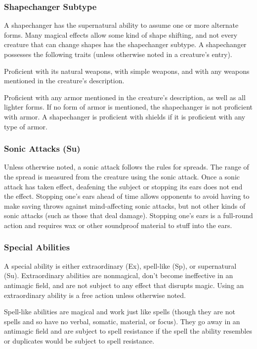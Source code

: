 {\subsubsection{Shapechanger Subtype} A shapechanger has the supernatural ability to assume one or more alternate forms. Many magical effects allow some kind of shape shifting, and not every creature that can change shapes has the shapechanger subtype. 
 A shapechanger possesses the following traits (unless otherwise noted in a creature's entry).
\begin{itemize*}
\item Proficient with its natural weapons, with simple weapons, and with any weapons mentioned in the creature's description.
\item Proficient with any armor mentioned in the creature's description, as well as all lighter forms. If no form of armor is mentioned, the shapechanger is not proficient with armor. A shapechanger is proficient with shields if it is proficient with any type of armor.
\end{itemize*}

\subsubsection{Sonic Attacks (Su)} Unless otherwise noted, a sonic attack follows the rules for spreads. The range of the spread is measured from the creature using the sonic attack. Once a sonic attack has taken effect, deafening the subject or stopping its ears does not end the effect. Stopping one's ears ahead of time allows opponents to avoid having to make saving throws against mind-affecting sonic attacks, but not other kinds of sonic attacks (such as those that deal damage). Stopping one's ears is a full-round action and requires wax or other soundproof material to stuff into the ears.

\subsubsection{Special Abilities} A special ability is either extraordinary (Ex), spell-like (Sp), or supernatural (Su).
 Extraordinary abilities are nonmagical, don't become ineffective in an antimagic field, and are not subject to any effect that disrupts magic. Using an extraordinary ability is a free action unless otherwise noted.

 Spell-like abilities are magical and work just like spells (though they are not spells and so have no verbal, somatic, material, or focus). They go away in an antimagic field and are subject to spell resistance if the spell the ability resembles or duplicates would be subject to spell resistance.

}
